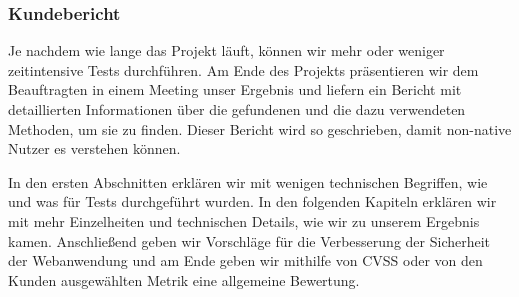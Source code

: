 \subsubsection{Kundebericht}

Je nachdem wie lange das Projekt läuft, können wir mehr oder weniger zeitintensive Tests durchführen. Am Ende des Projekts präsentieren wir dem Beauftragten in einem Meeting unser Ergebnis und liefern ein Bericht mit detaillierten Informationen über die gefundenen  und die dazu verwendeten Methoden, um sie zu finden. Dieser Bericht wird so geschrieben, damit non-native Nutzer es verstehen können. 

In den ersten Abschnitten erklären wir mit wenigen technischen Begriffen, wie und was für Tests durchgeführt wurden. In den folgenden Kapiteln erklären wir mit mehr Einzelheiten und technischen Details, wie wir zu unserem Ergebnis kamen. Anschließend geben wir Vorschläge für die Verbesserung der Sicherheit der Webanwendung und am Ende geben wir mithilfe von \gls{CVSS} oder von den Kunden ausgewählten Metrik eine allgemeine Bewertung.
